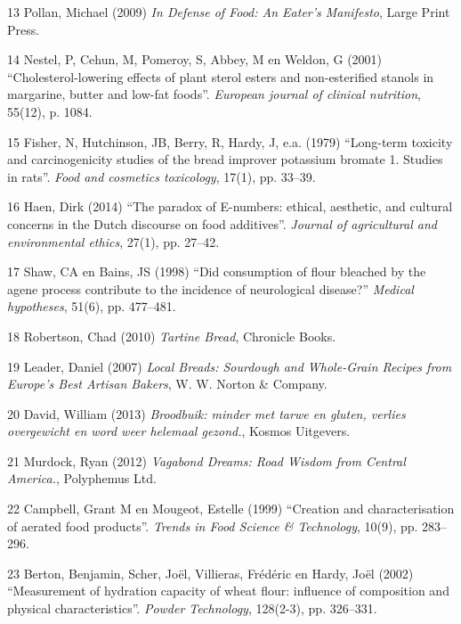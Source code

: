 \documentclass[
  11pt,
  dutch,
]{memoir}
\newlength{\cslhangindent}
\newenvironment{cslreferences}%
  {\setlength{\parindent}{0pt}%
  \everypar{\setlength{\hangindent}{\cslhangindent}}\ignorespaces}%
  {\par}
\begin{document}
\begin{cslreferences}
\leavevmode\hypertarget{ref-pollanfood}{}%
13 Pollan, Michael (2009) \emph{In Defense of Food: An Eater's
Manifesto}, Large Print Press.

\leavevmode\hypertarget{ref-nestel2001cholesterol}{}%
14 Nestel, P, Cehun, M, Pomeroy, S, Abbey, M en Weldon, G (2001)
``Cholesterol-lowering effects of plant sterol esters and non-esterified
stanols in margarine, butter and low-fat foods''. \emph{European journal
of clinical nutrition}, 55(12), p. 1084.

\leavevmode\hypertarget{ref-fisher1979long}{}%
15 Fisher, N, Hutchinson, JB, Berry, R, Hardy, J, e.a. (1979)
``Long-term toxicity and carcinogenicity studies of the bread improver
potassium bromate 1. Studies in rats''. \emph{Food and cosmetics
toxicology}, 17(1), pp. 33--39.

\leavevmode\hypertarget{ref-haen2014paradox}{}%
16 Haen, Dirk (2014) ``The paradox of E-numbers: ethical, aesthetic, and
cultural concerns in the Dutch discourse on food additives''.
\emph{Journal of agricultural and environmental ethics}, 27(1), pp.
27--42.

\leavevmode\hypertarget{ref-shaw1998did}{}%
17 Shaw, CA en Bains, JS (1998) ``Did consumption of flour bleached by
the agene process contribute to the incidence of neurological disease?''
\emph{Medical hypotheses}, 51(6), pp. 477--481.

\leavevmode\hypertarget{ref-tartine}{}%
18 Robertson, Chad (2010) \emph{Tartine Bread}, Chronicle Books.

\leavevmode\hypertarget{ref-leaderlocalbreads}{}%
19 Leader, Daniel (2007) \emph{Local Breads: Sourdough and Whole-Grain
Recipes from Europe's Best Artisan Bakers}, W. W. Norton \& Company.

\leavevmode\hypertarget{ref-broodbuik}{}%
20 David, William (2013) \emph{Broodbuik: minder met tarwe en gluten,
verlies overgewicht en word weer helemaal gezond.}, Kosmos Uitgevers.

\leavevmode\hypertarget{ref-vagabond}{}%
21 Murdock, Ryan (2012) \emph{Vagabond Dreams: Road Wisdom from Central
America.}, Polyphemus Ltd.

\leavevmode\hypertarget{ref-campbell1999creation}{}%
22 Campbell, Grant M en Mougeot, Estelle (1999) ``Creation and
characterisation of aerated food products''. \emph{Trends in Food
Science \& Technology}, 10(9), pp. 283--296.

\leavevmode\hypertarget{ref-berton2002measurement}{}%
23 Berton, Benjamin, Scher, Joël, Villieras, Frédéric en Hardy, Joël
(2002) ``Measurement of hydration capacity of wheat flour: influence of
composition and physical characteristics''. \emph{Powder Technology},
128(2-3), pp. 326--331.


\end{cslreferences}
\end{document}
